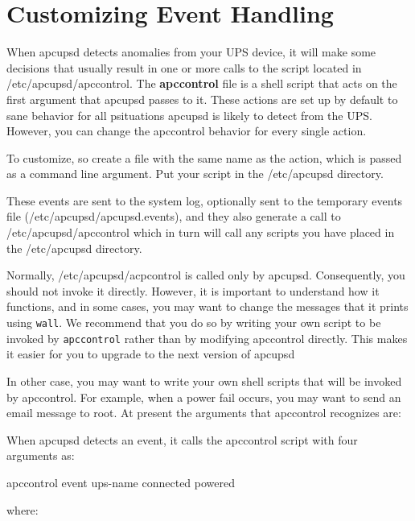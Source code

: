 {{{{{{\section*{Customizing Event Handling}

\label{index-Event-handling-150}
\label{index-Customizing-event-handling-151}

When apcupsd detects anomalies from your UPS device, it will make some
decisions that usually result in one or more calls to the script located in
/etc/apcupsd/apccontrol. The {\bf apccontrol} file is a shell script that acts
on the first argument that apcupsd passes to it. These actions are set up by
default to sane behavior for all psituations apcupsd is likely to detect from
the UPS. However, you can change the apccontrol behavior for every single
action.  

To customize, so create a file with the same name as the action, which is
passed as a command line argument. Put your script in the /etc/apcupsd
directory.  

These events are sent to the system log, optionally sent to the temporary
events file (/etc/apcupsd/apcupsd.events), and they also generate a call to
/etc/apcupsd/apccontrol which in turn will call any scripts you have placed in
the /etc/apcupsd directory.  

Normally, /etc/apcupsd/acpcontrol is called only by apcupsd. Consequently, you
should not invoke it directly.  However, it is important to understand how it
functions, and in some cases, you may want to change the messages that it
prints using {\tt wall}. We recommend that you do so by writing your own
script to be invoked by {\tt apccontrol} rather than by modifying apccontrol
directly. This makes it easier for you to upgrade to the next version of
apcupsd  

In other case, you may want to write your own shell scripts that will be
invoked by apccontrol. For example, when a power fail occurs, you may want to
send an email message to root. At present the arguments that apccontrol
recognizes are:  

When apcupsd detects an event, it calls the apccontrol script with four
arguments as:  

apccontrol \lt{}event\gt{} \lt{}ups-name\gt{} \lt{}connected\gt{}
\lt{}powered\gt{}  

where:  

\begin{description}


\end{description}}}}}}}
